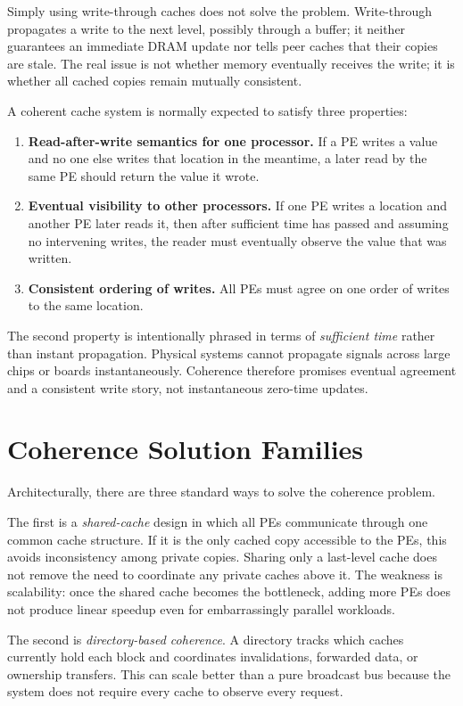 Simply using write-through caches does not solve the problem.
Write-through propagates a write to the next level, possibly through a buffer; it neither guarantees an immediate DRAM update nor tells peer caches that their copies are stale.
The real issue is not whether memory eventually receives the write; it is whether all cached copies remain mutually consistent.

A coherent cache system is normally expected to satisfy three properties:
\begin{enumerate}
    \item \textbf{Read-after-write semantics for one processor.} If a PE writes a value and no one else writes that location in the meantime, a later read by the same PE should return the value it wrote.
    \item \textbf{Eventual visibility to other processors.} If one PE writes a location and another PE later reads it, then after sufficient time has passed and assuming no intervening writes, the reader must eventually observe the value that was written.
    \item \textbf{Consistent ordering of writes.} All PEs must agree on one order of writes to the same location.
\end{enumerate}
The second property is intentionally phrased in terms of \textit{sufficient time} rather than instant propagation.
Physical systems cannot propagate signals across large chips or boards instantaneously.
Coherence therefore promises eventual agreement and a consistent write story, not instantaneous zero-time updates.


\section{Coherence Solution Families}\label{sec:mp-coherence-families}
Architecturally, there are three standard ways to solve the coherence problem.

The first is a \textit{shared-cache} design in which all PEs communicate through one common cache structure.
If it is the only cached copy accessible to the PEs, this avoids inconsistency among private copies.
Sharing only a last-level cache does not remove the need to coordinate any private caches above it.
The weakness is scalability: once the shared cache becomes the bottleneck, adding more PEs does not produce linear speedup even for embarrassingly parallel workloads.

The second is \textit{directory-based coherence}.
A directory tracks which caches currently hold each block and coordinates invalidations, forwarded data, or ownership transfers.
This can scale better than a pure broadcast bus because the system does not require every cache to observe every request.

